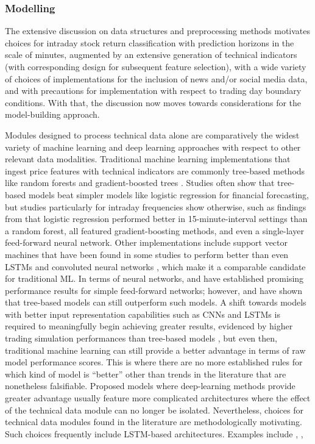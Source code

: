 \documentclass[stu,floatsintext]{apa7}
\begin{document}
\subsubsection{Modelling}

The extensive discussion on data structures and preprocessing methods motivates choices for intraday stock return classification with prediction horizons in the scale of minutes, augmented by an extensive generation of technical indicators (with corresponding design for subsequent feature selection), with a wide variety of choices of implementations for the inclusion of news and/or social media data, and with precautions for implementation with respect to trading day boundary conditions. With that, the discussion now moves towards considerations for the model-building approach.

Modules designed to process technical data alone are comparatively the widest variety of machine learning and deep learning approaches with respect to other relevant data modalities. Traditional machine learning implementations that ingest price features with technical indicators are commonly tree-based methods like random forests \parencite{lohrmann2018classification} and gradient-boosted trees \parencite{lohrmann2018classification}. Studies often show that tree-based models beat simpler models like logistic regression \parencite{jarmulska2021random,basak2018predicting} for financial forecasting, but studies particularly for intraday frequencies show otherwise, such as findings from \textcite{khan2023performance} that logistic regression performed better in 15-minute-interval settings than a random forest, all featured gradient-boosting methods, and even a single-layer feed-forward neural network. Other implementations include support vector machines \parencite{beniwal2025adaptive} that have been found in some studies to perform better than even LSTMs and convoluted neural networks \parencite{arora2019using}, which make it a comparable candidate for traditional ML. In terms of neural networks, \textcite{deoliveira2013applying} and \textcite{shen2015forecasting} have established promising performance results for simple feed-forward networks; however, \textcite{patel2014predicting} and \textcite{krauss2016deep} have shown that tree-based models can still outperform such models. A shift towards models with better input representation capabilities such as CNNs and LSTMs is required to meaningfully begin achieving greater results, evidenced by higher trading simulation performances than tree-based models \parencite{ghosh2022forecasting}, but even then, traditional machine learning can still provide a better advantage in terms of raw model performance scores. This is where there are no more established rules for which kind of model is ``better'' other than trends in the literature that are nonetheless falsifiable. Proposed models where deep-learning methods provide greater advantage usually feature more complicated architectures where the effect of the technical data module can no longer be isolated. Nevertheless, choices for technical data modules found in the literature are methodologically motivating. Such choices frequently include LSTM-based architectures. Examples include \textcite{chen2024deep}, \textcite{halder2022finbertlstm}, 
\end{document}
